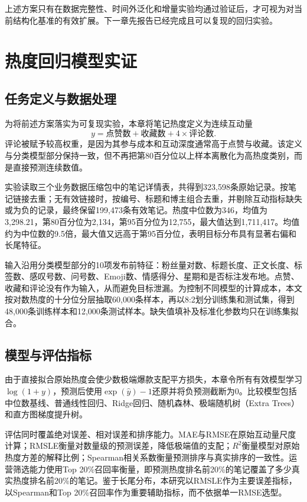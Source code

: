 上述方案只有在数据完整性、时间外泛化和增量实验均通过验证后，才可视为对当前结构化基准的有效扩展。下一章先报告已经完成且可以复现的回归实验。

\chapter{热度回归模型实证}

\section{任务定义与数据处理}

为将前述方案落实为可复现实验，本章将笔记热度定义为连续互动量
\begin{equation}
	y=\text{点赞数}+\text{收藏数}+4\times\text{评论数}.
\end{equation}
评论被赋予较高权重，是因为其参与成本和互动深度通常高于点赞与收藏。该定义与分类模型部分保持一致，但不再把第80百分位以上样本离散化为高热度类别，而是直接预测连续数值。

实验读取三个业务数据压缩包中的笔记详情表，共得到323,598条原始记录。按笔记链接去重；无有效链接时，按编号、标题和博主组合去重，并剔除互动指标缺失或为负的记录，最终保留199,473条有效笔记。热度中位数为346，均值为3,298.21，第80百分位为2,134，第95百分位为12,755，最大值达到1,711,417。均值约为中位数的9.5倍，最大值又远高于第95百分位，表明目标分布具有显著右偏和长尾特征。

输入沿用分类模型部分的10项发布前特征：粉丝量对数、标题长度、正文长度、标签数、感叹号数、问号数、Emoji数、情感得分、星期和是否标注发布地。点赞、收藏和评论没有作为输入，从而避免目标泄漏。为控制不同模型的计算成本，本文按对数热度的十分位分层抽取60,000条样本，再以8:2划分训练集和测试集，得到48,000条训练样本和12,000条测试样本。缺失值填补及标准化参数均只在训练集拟合。

\section{模型与评估指标}

由于直接拟合原始热度会使少数极端爆款支配平方损失，本章令所有有效模型学习$\log(1+y)$，预测后使用$\exp(\hat y)-1$还原并将负预测截断为0。比较模型包括中位数基线、普通线性回归、Ridge回归、随机森林、极端随机树（Extra Trees）和直方图梯度提升树。

评估同时覆盖绝对误差、相对误差和排序能力。MAE与RMSE在原始互动量尺度计算；RMSLE衡量对数量级的预测误差，降低极端值的支配；$R^2$衡量模型对原始热度方差的解释比例；Spearman相关系数衡量预测排序与真实排序的一致性。运营筛选能力使用Top 20\%召回率衡量，即预测热度排名前20\%的笔记覆盖了多少真实热度排名前20\%的笔记。鉴于长尾分布，本研究以RMSLE作为主要误差指标，以Spearman和Top 20\%召回率作为重要辅助指标，而不依据单一RMSE选型。

